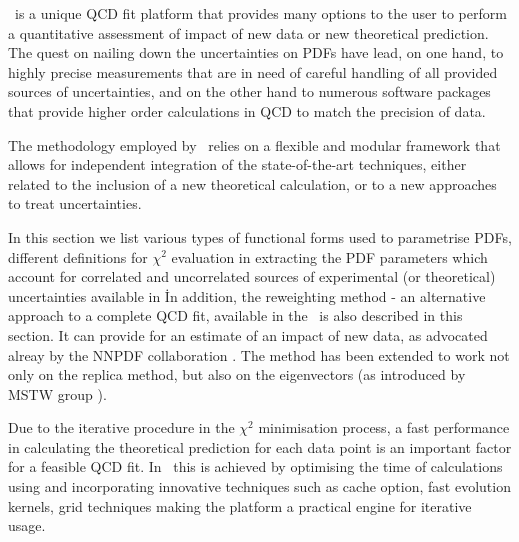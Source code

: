 
\fitter\ is a unique QCD fit platform that provides  many options to the user to perform a quantitative assessment of impact of new data or new theoretical prediction. The quest on nailing down the uncertainties on PDFs have lead, on one hand, to highly precise measurements that are in need of careful handling of all provided sources of uncertainties, and on the other hand to numerous software packages that provide higher order calculations in QCD to match the precision of data.

The methodology employed by \fitter\  relies on a flexible and modular
framework that allows for independent integration of the state-of-the-art techniques, 
either related to the inclusion of a new theoretical calculation, or to a new approaches to treat uncertainties.

In this section we list various types of functional forms used to parametrise PDFs, different definitions for  $\chi^2$ evaluation in extracting the PDF parameters which account for correlated and uncorrelated sources of experimental (or theoretical) uncertainties available in \fitter\. 
In addition, the reweighting method - an alternative approach to a complete QCD fit, available in the \fitter\ is also described in this section. It can provide for an estimate of an impact of new data, as advocated 
alreay by the NNPDF collaboration \cite{Ball:2011gg,Ball:2010gb}.
The method has been extended to work not only on the replica method, 
but also on the eigenvectors (as introduced by MSTW group \cite{Watt:2012tq}).

Due to the iterative procedure in the $\chi^2$ minimisation process, a fast performance in calculating the 
theoretical prediction for each data point is an important factor for a feasible QCD fit.
In \fitter\ this is achieved by optimising the time of calculations using and incorporating innovative techniques such as cache option, fast evolution kernels, grid techniques making the platform a practical engine for iterative usage.


